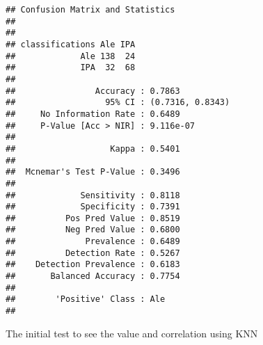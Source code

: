 \documentclass[
]{article}
\begin{document}
\begin{verbatim}
## Confusion Matrix and Statistics
## 
##                
## classifications Ale IPA
##             Ale 138  24
##             IPA  32  68
##                                           
##                Accuracy : 0.7863          
##                  95% CI : (0.7316, 0.8343)
##     No Information Rate : 0.6489          
##     P-Value [Acc > NIR] : 9.116e-07       
##                                           
##                   Kappa : 0.5401          
##                                           
##  Mcnemar's Test P-Value : 0.3496          
##                                           
##             Sensitivity : 0.8118          
##             Specificity : 0.7391          
##          Pos Pred Value : 0.8519          
##          Neg Pred Value : 0.6800          
##              Prevalence : 0.6489          
##          Detection Rate : 0.5267          
##    Detection Prevalence : 0.6183          
##       Balanced Accuracy : 0.7754          
##                                           
##        'Positive' Class : Ale             
## 
\end{verbatim}

The initial test to see the value and correlation using KNN
\end{document}
